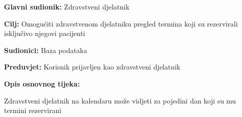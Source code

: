 					\noindent {}
					\begin{packed_item}
						
						\item \textbf{Glavni sudionik: }Zdravstveni djelatnik
						\item  \textbf{Cilj:} Omogućiti zdravstvenom djelatniku pregled termina koji su rezervirali isključivo njegovi pacijenti
						\item  \textbf{Sudionici:} Baza podataka
						\item  \textbf{Preduvjet:} Korisnik prijavljen kao zdravstveni djelatnik
						\item  \textbf{Opis osnovnog tijeka:}
						
						\item[] \begin{packed_enum}
							
							\item Zdravstveni djelatnik na kalendaru može vidjeti za pojedini dan koji su mu termini rezervirani
						\end{packed_enum}
					\end{packed_item}

